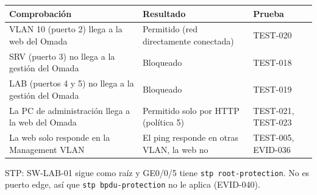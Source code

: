 \documentclass[11pt,a4paper]{article}
\newcommand{\cab}{\rowcolor{light}}
\begin{document}
\begin{tabularx}{\textwidth}{Z L{3.6cm} L{2.6cm}}
  \toprule
  \cab\textbf{Comprobación} & \textbf{Resultado} & \textbf{Prueba}\\
  \midrule
  VLAN 10 (puerto 2) llega a la web del Omada & Permitido (red directamente conectada) & TEST-020\\
  SRV (puerto 3) no llega a la gestión del Omada & Bloqueado & TEST-018\\
  LAB (puertos 4 y 5) no llega a la gestión del Omada & Bloqueado & TEST-019\\
  La PC de administración llega a la web del Omada & Permitido solo por HTTP (política 5) & TEST-021, TEST-023\\
  La web solo responde en la Management VLAN & El ping responde en otras VLAN, la web no & TEST-005, EVID-036\\
  \bottomrule
\end{tabularx}

STP: SW-LAB-01 sigue como raíz y GE0/0/5 tiene \texttt{stp root-protection}. No es puerto edge, así que \texttt{stp bpdu-protection} no le aplica (EVID-040).
\end{document}
